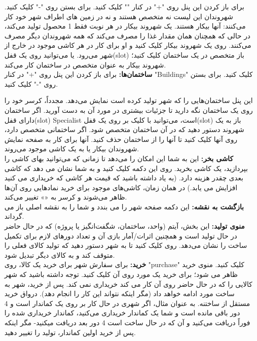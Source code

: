 \documentclass[]{article}
\begin{document}
برای باز کردن این پنل روی "+" در کنار "" کلیک کنید. برای بستن روی "-" کلیک کنید. شهروندان این لیست نه متخصص هستند و نه در زمین های اطراف شهر خود کار می‌کنند: آنها بیکار هستند. یک شهروند بیکار در هر نوبت فقط 1 محصول تولید می‌کند، در حالی که همچنان همان مقدار غذا را مصرف می‌کند که همه شهروندان دیگر مصرف می‌کنند. روی یک شهروند بیکار کلیک کنید و او برای کار در هر کاشی موجود در خارج از شهر می‌رود. یا می‌توانید روی یک قفل(slot) باز متخصص در یک ساختمان کلیک کنید؛ شهروند بیکار به عنوان متخصص در ساختمان کار می‌کند.
\\\noindent \textbf{ساختمان‌ها:} برای باز کردن این پنل روی "+" در کنار "Buildings" کلیک کنید. برای بستن روی "-" کلیک کنید. 

این پنل ساختمان‌هایی را که شهر تولید کرده است نمایش می‌دهد. مجدداً، کرسر خود را روی یک ساختمان نگه دارید تا جزئیات بیشتری در مورد آن به دست آورید. اگر ساختمان دارای قفل(slot) Specialist است، می‌توانید با کلیک بر روی یک قفل(slot)  باز به یک شهروند دستور دهید که در آن ساختمان متخصص شود. اگر ساختمانی متخصص دارد، روی آنها کلیک کنید تا آنها را از ساختمان حذف کنید. آنها برای کار به صفحه نمایش شهروندان بیکار یا به یک کاشی موجود می‌روند.
\\\noindent \textbf{کاشی بخر:}
این به شما این امکان را می‌دهد تا زمانی که می‌توانید بهای کاشی را بپردازید، یک کاشی بخرید. روی این دکمه کلیک کنید و به شما نشان می دهد که کاشی بعدی چقدر هزینه دارد. (به یاد داشته باشید که قیمت هر کاشی که خریداری می کنید افزایش می یابد.) در همان زمان، کاشی‌های موجود برای خرید نمادهایی روی آن‌ها ظاهر می‌شوند و کرسر به «» تغییر می‌کند.
\\\noindent \textbf{بازگشت به نقشه:}
این دکمه صفحه شهر را می بندد و شما را به نقشه اصلی باز می گرداند.
\\\noindent \textbf{منوی تولید:}
این بخش، آیتم (واحد، ساختمان، شگفت‌انگیز یا پروژه) که در حال حاضر در حال تولید است و همچنین اثرات/آمار بازی آن و تعداد دورهای لازم برای تکمیل ساخت را نشان می‌دهد. روی  کلیک کنید تا به شهر دستور دهید که تولید کالای فعلی را متوقف کند و به کالای دیگر تبدیل شود.
\\\noindent \textbf{خرید:}
برای سفارش شهر برای خرید یک کالا، روی "purchase" کلیک کنید. منوی خرید ظاهر می شود؛ برای خرید یک مورد روی آن کلیک کنید. توجه داشته باشید که شهر کالایی را که در حال حاضر روی آن کار می کند خریداری نمی کند. پس از خرید، شهر به ساخت مورد ادامه خواهد داد (مگر اینکه نتواند این کار را انجام دهد).  درواق خرید مستقل از ساختنه. به عنوان مثال، اگر شهری در حال کار بر روی یک کماندار است و 4 دور باقی مانده است و شما یک کماندار خریداری می‌کنید، کماندار خریداری شده را فوراً دریافت می‌کنید و آن که در حال ساخت است 4 دور بعد دریافت میکنید- مگر اینکه پس از خرید اولین کماندار، تولید را تغییر دهید.
\end{document}
